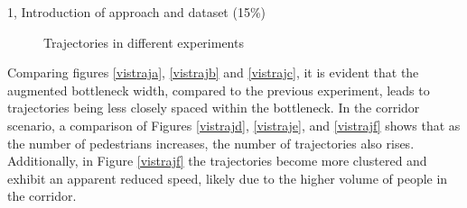 \begin{task}{1, Introduction of approach and dataset (15\%)}
\begin{figure}[H]
\caption{Trajectories in different experiments}
\label{vistraj}
\end{figure}

Comparing figures \ref{vistraja}, \ref{vistrajb} and \ref{vistrajc}, it is evident that the augmented bottleneck width, compared to the previous experiment, leads to trajectories being less closely spaced within the bottleneck. In the corridor scenario, a comparison of Figures \ref{vistrajd}, \ref{vistraje}, and \ref{vistrajf} shows that as the number of pedestrians increases, the number of trajectories also rises. Additionally, in Figure \ref{vistrajf} the trajectories become more clustered and exhibit an apparent reduced speed, likely due to the higher volume of people in the corridor.
\end{task}